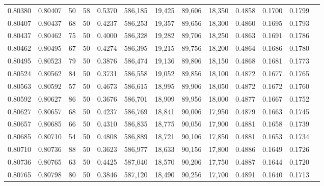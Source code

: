 \begin{tabular}{rrrrrrrrrrrrr}
0.80380 & 0.80407 &    50 &  58 &                                     0.5370 & 586,185 &  19,425 &  89,606 &  18,350 & 0.4858 & 0.1700 & 0.1799 \\
0.80407 & 0.80437 &    68 &  50 &                                     0.4237 & 586,253 &  19,357 &  89,656 &  18,300 & 0.4860 & 0.1695 & 0.1793 \\
0.80437 & 0.80462 &    75 &  50 &                                     0.4000 & 586,328 &  19,282 &  89,706 &  18,250 & 0.4863 & 0.1691 & 0.1786 \\
0.80462 & 0.80495 &    67 &  50 &                                     0.4274 & 586,395 &  19,215 &  89,756 &  18,200 & 0.4864 & 0.1686 & 0.1780 \\
0.80495 & 0.80523 &    79 &  50 &                                     0.3876 & 586,474 &  19,136 &  89,806 &  18,150 & 0.4868 & 0.1681 & 0.1773 \\
0.80524 & 0.80562 &    84 &  50 &                                     0.3731 & 586,558 &  19,052 &  89,856 &  18,100 & 0.4872 & 0.1677 & 0.1765 \\
0.80563 & 0.80592 &    57 &  50 &                                     0.4673 & 586,615 &  18,995 &  89,906 &  18,050 & 0.4872 & 0.1672 & 0.1760 \\
0.80592 & 0.80627 &    86 &  50 &                                     0.3676 & 586,701 &  18,909 &  89,956 &  18,000 & 0.4877 & 0.1667 & 0.1752 \\
0.80627 & 0.80657 &    68 &  50 &                                     0.4237 & 586,769 &  18,841 &  90,006 &  17,950 & 0.4879 & 0.1663 & 0.1745 \\
0.80657 & 0.80685 &    66 &  50 &                                     0.4310 & 586,835 &  18,775 &  90,056 &  17,900 & 0.4881 & 0.1658 & 0.1739 \\
0.80685 & 0.80710 &    54 &  50 &                                     0.4808 & 586,889 &  18,721 &  90,106 &  17,850 & 0.4881 & 0.1653 & 0.1734 \\
0.80710 & 0.80736 &    88 &  50 &                                     0.3623 & 586,977 &  18,633 &  90,156 &  17,800 & 0.4886 & 0.1649 & 0.1726 \\
0.80736 & 0.80765 &    63 &  50 &                                     0.4425 & 587,040 &  18,570 &  90,206 &  17,750 & 0.4887 & 0.1644 & 0.1720 \\
0.80765 & 0.80798 &    80 &  50 &                                     0.3846 & 587,120 &  18,490 &  90,256 &  17,700 & 0.4891 & 0.1640 & 0.1713 \\

\end{tabular}
